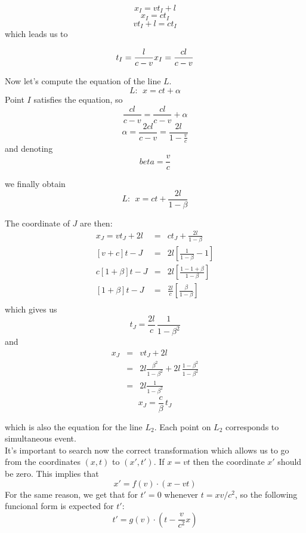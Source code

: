\[x_I=vt_I+l\]
\[x_I=ct_I\]
\[vt_I+l=ct_I\]
which leads us to

\begin{equation}
t_I=\frac{l}{c-v} \hfill x_I=\frac{cl}{c-v}
\end{equation}

Now let's compute the equation of the line $L$.
\[L:\ \ x=ct+\alpha\]
Point $I$ satisfies the equation, so
\[\frac{cl}{c-v} = \frac{cl}{c-v} + \alpha\]
\[\alpha = \frac{2cl}{c-v} = \frac{2l}{1-\frac{v}{c}}\]
and denoting
\begin{equation}
  \label{eq:beta}
  beta = \frac{v}{c}
\end{equation}

we finally obtain
\begin{equation}
  L:\ \ x=ct+\frac{2l}{1-\beta}
\end{equation}

The coordinate of $J$ are then:
\begin{eqnarray*}
  x_J = vt_J+2l &=& ct_J+\frac{2l}{1-\beta}\\
  \left[v+c\right]t-J &=& 2l \left[\frac{1}{1-\beta}-1\right]\\
  c\left[1+\beta\right]t-J &=& 2l \left[\frac{1-1+\beta}{1-\beta}\right]\\
  \left[1+\beta\right]t-J &=& \frac{2l}{c} \left[\frac{\beta}{1-\beta}\right]\\
\end{eqnarray*}
which gives us
\begin{equation}
  t_J =\frac{2l}{c}\,\frac{1}{1-\beta^2}
\end{equation}
and
\begin{eqnarray*}
  x_J &=& vt_J+2l\\
  &=& 2l \frac{\beta^2}{1-\beta^2} + 2l\,\frac{1-\beta^2}{1-\beta^2}\\
  &=& 2l \frac{1}{1-\beta^2}
\end{eqnarray*}
\begin{equation}
  x_J = \frac{c}{\beta}\,t_J
\end{equation}

which is also the equation for the line $L_2$. Each point on $L_2$ corresponds to simultaneous event.\\

It's important to search now the correct transformation which allows us to go from the coordinates $(x,t)$ to $(x',t')$. If $x = vt $ then the coordinate $x'$ should be zero. This implies that
\[x' = f(v)\cdot(x-vt)\]
For the same reason, we get that for $t'=0$ whenever $t = xv/c^2 $, so the following funcional form is expected for $t'$:
\[t' = g(v)\cdot\left(t-\frac{v}{c^2}x\right)\]

